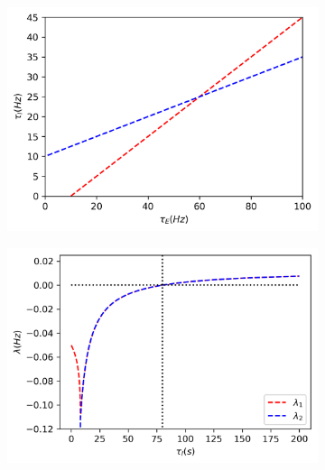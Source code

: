 \documentclass{article}
\begin{document}
\begin{figure}[h]
	\centering
	\begin{subfigure}[t]{0.45\linewidth}
		\centering
		\includegraphics[width = 1.0\linewidth, trim={0 7 0 0}, clip=true]{nullclines.png}
		\label{fig:nulls}	
	\end{subfigure}%
	\hspace{0.001\linewidth}
	\begin{subfigure}[t]{0.45\linewidth}
		\centering
		\includegraphics[width = 1.0\linewidth, trim={0 7 0 0}, clip=true]{ti_scan.png}
		\label{fig:ti}	
	\end{subfigure}%
\end{figure}
\end{document}
